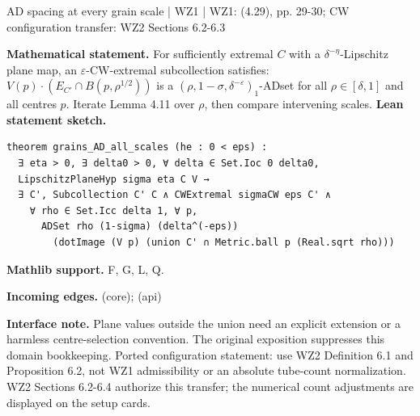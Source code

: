 \documentclass[10pt,a4paper]{article}
\newcommand{\nodecard}[1]{\hyperlink{node-#1}{\texttt{\detokenize{#1}}}}
\begin{document}
\begin{minipage}{\linewidth}
\hypertarget{node-L4_12}{}
\begin{tcolorbox}[colback=white,colframe=grainsfg,colbacktitle=grainsbg,coltitle=ink,boxrule=0.45pt,arc=1.6mm,left=3mm,right=3mm,top=2mm,bottom=2mm,title={\sffamily\bfseries WZ1 Lemma 4.12 / CW \hfill \texttt{L4\_12}}]
{\sffamily\small\color{muted}AD spacing at every grain scale | WZ1 | WZ1: (4.29), pp. 29-30; CW configuration transfer: WZ2 Sections 6.2-6.3}\par
\textbf{Mathematical statement.} For sufficiently extremal $C$ with a $\delta^{-\eta}$-Lipschitz plane map, an $\varepsilon$-CW-extremal subcollection satisfies:
$V(p)\cdot(E_{C'}\cap B(p,\rho^{1/2}))$ is a $(\rho,1-\sigma,\delta^{-\varepsilon})_1$-ADset for all $\rho\in[\delta,1]$ and all centres $p$.
Iterate Lemma 4.11 over $\rho$, then compare intervening scales.
\smallskip\textbf{Lean statement sketch.}
\begin{Verbatim}[fontsize=\small,breaklines=true,breakanywhere=true,tabsize=2]
theorem grains_AD_all_scales (he : 0 < eps) :
  ∃ eta > 0, ∃ delta0 > 0, ∀ delta ∈ Set.Ioc 0 delta0,
  LipschitzPlaneHyp sigma eta C V →
  ∃ C', Subcollection C' C ∧ CWExtremal sigmaCW eps C' ∧
    ∀ rho ∈ Set.Icc delta 1, ∀ p,
      ADSet rho (1-sigma) (delta^(-eps))
        (dotImage (V p) (union C' ∩ Metric.ball p (Real.sqrt rho)))
\end{Verbatim}
{\footnotesize\textbf{Mathlib support.} F, G, L, Q.\par
\textbf{Incoming edges.} \nodecard{L4_11} (core); \nodecard{Iparams} (api)\par}
{\footnotesize\textbf{Interface note.} Plane values outside the union need an explicit extension or a harmless centre-selection convention. The original exposition suppresses this domain bookkeeping. Ported configuration statement: use WZ2 Definition 6.1 and Proposition 6.2, not WZ1 admissibility or an absolute tube-count normalization. WZ2 Sections 6.2-6.4 authorize this transfer; the numerical count adjustments are displayed on the setup cards.}
\end{tcolorbox}\end{minipage}\par\medskip
\end{document}
